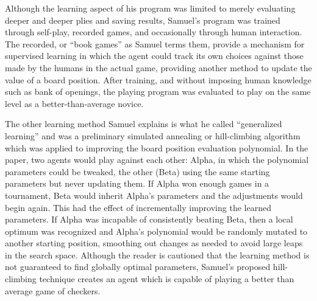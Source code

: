 Although the learning aspect of his program was limited to merely evaluating
deeper and deeper plies and saving results,
Samuel's program was trained through self-play, recorded games, and occasionally
through human interaction.
%
The recorded, or ``book games'' as Samuel terms them,
provide a mechanism for supervised learning in which the agent could track its
own choices against those made by the humans in the actual game,
providing another method to update the value of a board position.
%
After training,
and without imposing human knowledge such as bank of openings,
the playing program was evaluated to play on the same level as a
better-than-average novice.

The other learning method Samuel explains is what he called
``generalized learning''
and was a preliminary simulated annealing or hill-climbing algorithm
which was applied to improving the board position evaluation polynomial.
%
In the paper,
two agents would play against each other:
Alpha, in which the polynomial parameters could be tweaked,
the other (Beta) using the same starting parameters but never updating them.
%
If Alpha won enough games in a tournament,
Beta would inherit Alpha's parameters and the adjustments would begin again.
%
This had the effect of incrementally improving the learned parameters.
%
If Alpha was incapable of consistently beating Beta,
then a local optimum was recognized and Alpha's polynomial would be randomly
mutated to another starting position,
smoothing out changes as needed to avoid large leaps in the search space.
%
Although the reader is cautioned that the learning method is not guaranteed to
find globally optimal parameters,
Samuel's proposed hill-climbing technique creates an agent which is capable
of playing a better than average game of checkers.

